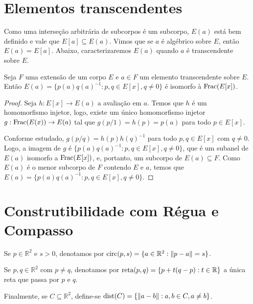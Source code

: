 \section{Elementos transcendentes}
Como uma interseção arbitrária de subcorpos é um subcorpo, $E(a)$ está bem definido e vale que $E[a]\subseteq E(a)$. Vimos que se $a$ é algébrico sobre $E$, então $E(a)=E[a]$. Abaixo, caracterizaremos $E(a)$ quando $a$ é transcendente sobre $E$.
\begin{prop}
        Seja $F$ uma extensão de um corpo $E$ e $a \in F$ um elemento transcendente sobre $E$. Então $E(a)=\{p(a)q(a)^{-1}: p, q \in E[x], q\neq 0\}$ é isomorfo à $\operatorname{Frac}(E[x])$.
\end{prop}
\begin{proof}
    Seja $h:E[x] \rightarrow E(a)$ a avaliação em $a$. Temos que $h$ é um homomorfismo injetor, logo, existe um único homomorfismo injetor $g:\operatorname{Frac}(E(x))\rightarrow E(a)$ tal que $g(p/1)=h(p)=p(a)$ para todo $p \in E[x]$.

    Conforme estudado, $g(p/q)=h(p)h(q)^{-1}$ para todo $p, q \in E[x]$ com $q\neq 0$.
    Logo, a imagem de $g$ é $\{p(a)q(a)^{-1}: p, q \in E[x], q\neq 0\}$, que é um subanel de $E(a)$ isomorfo a $\operatorname{Frac}(E[x])$, e, portanto, um subcorpo de $E(a)\subseteq F$. Como $E(a)$ é o menor subcorpo de $F$ contendo $E$ e $a$, temos que $E(a)=\{p(a)q(a)^{-1}: p, q \in E[x], q\neq 0\}$.
\end{proof}
 
\section{Construtibilidade com Régua e Compasso}


\begin{definition}
    Se $p \in \mathbb R^2$ e $s>0$, denotamos por $\operatorname{circ}(p, s)=\{a \in \mathbb R^2: \|p-a\|=s\}$.

    Se $p, q \in \mathbb R^2$ com $p\neq q$, denotamos por $\operatorname{reta}(p, q)=\{p+t(q-p): t \in \mathbb R\}$ a única reta que passa por $p$ e $q$.

    Finalmente, se $C\subseteq \mathbb R^2$, define-se $\operatorname{dist}(C)=\{\|a-b\|: a, b \in C, a\neq b\}$.
\end{definition}

